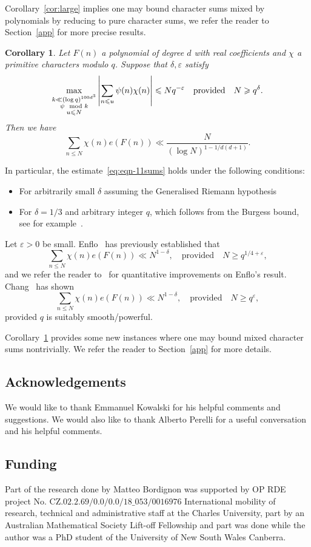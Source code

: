 \documentclass[12pt]{amsart}
\newtheorem{corollary}{Corollary}
\def\\{\cr}
\def\le{\leqslant}
\def\ge{\geqslant}
\begin{document}
Corollary~\ref{cor:large} implies one may bound character sums mixed by polynomials by reducing to pure character sums, we refer the reader to Section~\ref{app} for more precise results.
\begin{corollary}
\label{cor:Hild1}
Let $F(n)$ a polynomial of degree $d$ with real coefficients and $\chi$ a primitive characters modulo $q$. Suppose that $\delta,\varepsilon$ satisfy
$$\max_{\substack{k\ll (\log{q})^{100d^3} \\ \psi \mod{k} \\ u \le N}}\left|\sum_{n\le u}\psi(n)\chi(n)\right|\le Nq^{-\varepsilon} \quad \text{provided} \quad N\ge q^{\delta}.$$
 Then we have 
\begin{equation}
\label{eq:eqn-11sums}
\sum_{n \le N} \chi(n) e(F(n))\ll\frac{N}{(\log N)^{1-1/d(d+1)}}.
\end{equation}
\end{corollary}
In particular, the estimate~\eqref{eq:eqn-11sums} holds under the following conditions:
\begin{itemize} 
\item For arbitrarily small $\delta$ assuming the Generalised Riemann hypothesis
\item For $\delta=1/3$ and arbitrary integer $q$, which follows from the Burgess bound, see for example~\cite{I-K}.
\end{itemize}
Let $\varepsilon>0$ be small.  Enflo~\cite{Enflo} has previously established that 
$$\sum_{n \le N} \chi(n) e(F(n))\ll N^{1-\delta}, \quad \text{provided} \quad N\ge q^{1/4+\varepsilon},$$
and we refer the reader to~\cite{Chang,H-B} for quantitative improvements on Enflo's result.
 Chang~\cite{Chang1} has shown
$$\sum_{n \le N} \chi(n) e(F(n))\ll N^{1-\delta}, \quad \text{provided} \quad N\ge q^{\varepsilon},$$
provided $q$ is suitably smooth/powerful. 

Corollary~\ref{cor:Hild1} provides some new instances where one may bound mixed character sums nontrivially. We refer the reader to Section~\ref{app} for more details.
\subsection{Acknowledgements}
We would like to thank Emmanuel Kowalski for his helpful comments and suggestions. We would also like to thank Alberto Perelli for a useful conversation and his helpful comments.
\subsection{Funding}
Part of the research done by Matteo Bordignon was supported by OP RDE project No.
CZ.$02.2.69/0.0/0.0/18\_053/0016976$ International mobility of research,
technical and administrative staff at the Charles University, part by an Australian Mathematical Society Lift-off Fellowship and part was done while the author was a PhD student of the University of New South Wales Canberra.
\end{document}
